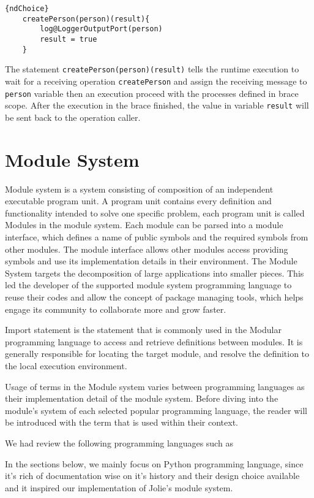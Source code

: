 \begin{lstlisting}{ndChoice}
    createPerson(person)(result){
        log@LoggerOutputPort(person)
        result = true
    }
\end{lstlisting}
The statement \texttt{createPerson(person)(result)} tells the runtime execution to wait for a receiving operation \texttt{createPerson} and assign the receiving message to \texttt{person} variable then an execution proceed with the processes defined in brace scope. After the execution in the brace finished, the value in variable \texttt{result} will be sent back to the operation caller.


\FloatBarrier






\section{Module System}

Module system is a system consisting of composition of an independent executable program unit. A program unit contains every definition and functionality intended to solve one specific problem, each program unit is called Modules in the module system. Each module can be parsed into a module interface, which defines a name of public symbols and the required symbols from other modules. The module interface allows other modules access providing symbols and use its implementation details in their environment. The Module System targets the decomposition of large applications into smaller pieces. This led the developer of the supported module system programming language to reuse their codes and allow the concept of package managing tools, which helps engage its community to collaborate more and grow faster.

Import statement is the statement that is commonly used in the Modular programming language to access and retrieve definitions between modules. It is generally responsible for locating the target module, and resolve the definition to the local execution environment.

Usage of terms in the Module system varies between programming languages as their implementation detail of the module system. Before diving into the module's system of each selected popular programming language, the reader will be introduced with the term that is used within their context.

We had review the following programming languages such as

In the sections below, we mainly focus on Python programming language, since it's rich of documentation wise on it's history and their design choice available and it inspired our implementation of Jolie's module system.


